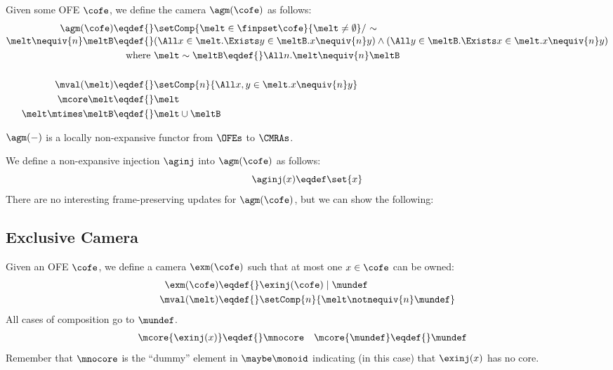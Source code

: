 Given some OFE $\cofe$, we define the camera $\agm(\cofe)$ as follows:
\begin{align*}
  \agm(\cofe) \eqdef{}& \setComp{\melt \in \finpset\cofe}{\melt \neq \emptyset} /\ {\sim} \\[-0.2em]
  \melt \nequiv{n} \meltB \eqdef{}& (\All x \in \melt. \Exists y \in \meltB. x \nequiv{n} y) \land (\All y \in \meltB. \Exists x \in \melt. x \nequiv{n} y) \\
  \textnormal{where }& \melt \sim \meltB \eqdef{} \All n. \melt \nequiv{n} \meltB  \\
~\\
  \mval(\melt) \eqdef{}& \setComp{n}{ \All x, y \in \melt. x \nequiv{n} y } \\
  \mcore\melt \eqdef{}& \melt \\
  \melt \mtimes \meltB \eqdef{}& \melt \cup \meltB
\end{align*}

$\agm(-)$ is a locally non-expansive functor from $\OFEs$ to $\CMRAs$.

We define a non-expansive injection $\aginj$ into $\agm(\cofe)$ as follows:
\[ \aginj(x) \eqdef \set{x} \]
There are no interesting frame-preserving updates for $\agm(\cofe)$, but we can show the following:
\begin{mathpar}

  
\end{mathpar}


\subsection{Exclusive Camera}

Given an OFE $\cofe$, we define a camera $\exm(\cofe)$ such that at most one $x \in \cofe$ can be owned:
\begin{align*}
  \exm(\cofe) \eqdef{}& \exinj(\cofe) \mid \mundef \\
  \mval(\melt) \eqdef{}& \setComp{n}{\melt \notnequiv{n} \mundef}
\end{align*}
All cases of composition go to $\mundef$.
\begin{align*}
  \mcore{\exinj(x)} \eqdef{}& \mnocore &
  \mcore{\mundef} \eqdef{}& \mundef
\end{align*}
Remember that $\mnocore$ is the ``dummy'' element in $\maybe\monoid$ indicating (in this case) that $\exinj(x)$ has no core.

